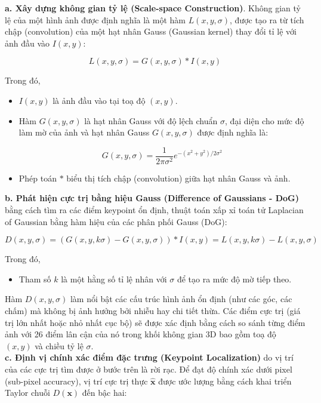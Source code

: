 \textbf{a. Xây dựng không gian tỷ lệ (Scale-space Construction)}. Không gian tỷ lệ của một hình ảnh được định nghĩa là một hàm $L(x, y, \sigma)$, được tạo ra từ tích chập (convolution) của một hạt nhân Gauss (Gaussian kernel) thay đổi tỉ lệ với ảnh đầu vào $I(x, y)$:

$$L(x, y, \sigma) = G(x, y, \sigma) * I(x, y)$$

Trong đó, 

\begin{itemize}
    \item $I(x, y)$ là ảnh đầu vào tại toạ độ $(x, y)$.
    \item Hàm $G(x, y, \sigma)$ là hạt nhân Gauss với độ lệch chuẩn $\sigma$, đại diện cho mức độ làm mờ của ảnh và hạt nhân Gauss $G(x, y, \sigma)$ được định nghĩa là:

$$G(x, y, \sigma) = \frac{1}{2\pi\sigma^2} e^{-(x^2 + y^2) / 2\sigma^2}$$
    \item Phép toán $*$ biểu thị tích chập (convolution) giữa hạt nhân Gauss và ảnh.
\end{itemize}

\textbf{b. Phát hiện cực trị bằng hiệu Gauss (Difference of Gaussians - DoG)} bằng cách tìm ra các điểm keypoint ổn định, thuật toán xấp xỉ toán tử Laplacian of Gaussian bằng hàm hiệu của các phân phối Gauss (DoG):

$$D(x, y, \sigma) = (G(x, y, k\sigma) - G(x, y, \sigma)) * I(x, y) = L(x, y, k\sigma) - L(x, y, \sigma)$$

Trong đó,
\begin{itemize}
    \item Tham số $k$ là một hằng số tỉ lệ nhân với $\sigma$ để tạo ra mức độ mờ tiếp theo.
\end{itemize}

Hàm $D(x, y, \sigma)$ làm nổi bật các cấu trúc hình ảnh ổn định (như các góc, các chấm) mà không bị ảnh hưởng bởi nhiễu hay chi tiết thừa. Các điểm cực trị (giá trị lớn nhất hoặc nhỏ nhất cục bộ) sẽ được xác định bằng cách so sánh từng điểm ảnh với 26 điểm lân cận của nó trong khối không gian 3D bao gồm toạ độ $(x, y)$ và chiều tỷ lệ $\sigma$. \\
 
\textbf{c. Định vị chính xác điểm đặc trưng (Keypoint Localization)} do
vị trí của các cực trị tìm được ở bước trên là rời rạc. Để đạt độ chính xác dưới pixel (sub-pixel accuracy), vị trí cực trị thực $\hat{\mathbf{x}}$ được ước lượng bằng cách khai triển Taylor chuỗi $D(\mathbf{x})$ đến bậc hai:

